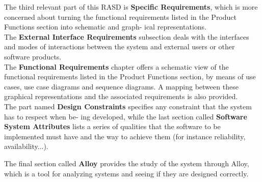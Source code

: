 The third relevant part of this RASD is \textbf{Specific Requirements}, which is more concerned about
turning the functional requirements listed in the Product Functions section into schematic and graph-
ical representations. \\
The \textbf{External Interface Requirements} subsection deals with the interfaces and modes of interactions
between the system and external users or other software products. \\
The \textbf{Functional Requirements} chapter offers a schematic view of the functional requirements listed
in the Product Functions section, by means of use cases, use case diagrams and sequence diagrams.
A mapping between these graphical representations and the associated requirements is also provided. \\
The part named \textbf{Design Constraints} specifies any constraint that the system has to respect when be-
ing developed, while the last section called \textbf{Software System Attributes} lists a series of qualities
that the software to be implemented must have and the way to achieve them (for instance reliability,
availability...).

The final section called \textbf{Alloy} provides the study of the system through Alloy, which is a tool for
analyzing systems and seeing if they are designed correctly.